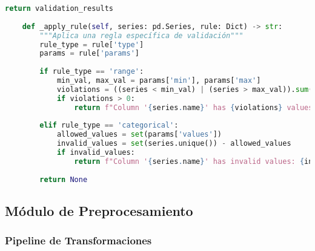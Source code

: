 \begin{lstlisting}[language=Python, caption=Sistema de validación de datos]
        return validation_results
    
    def _apply_rule(self, series: pd.Series, rule: Dict) -> str:
        """Aplica una regla específica de validación"""
        rule_type = rule['type']
        params = rule['params']
        
        if rule_type == 'range':
            min_val, max_val = params['min'], params['max']
            violations = ((series < min_val) | (series > max_val)).sum()
            if violations > 0:
                return f"Column '{series.name}' has {violations} values outside range [{min_val}, {max_val}]"
        
        elif rule_type == 'categorical':
            allowed_values = set(params['values'])
            invalid_values = set(series.unique()) - allowed_values
            if invalid_values:
                return f"Column '{series.name}' has invalid values: {invalid_values}"
        
        return None
\end{lstlisting}

\subsection{Módulo de Preprocesamiento}

\subsubsection{Pipeline de Transformaciones}

